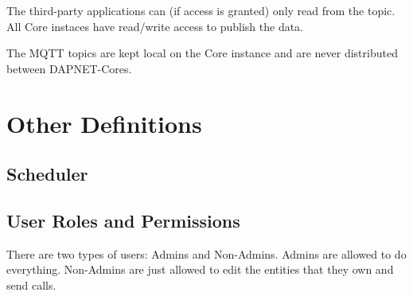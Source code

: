 The third-party applications can (if access is granted) only read from the
topic. All Core instaces have read/write access to publish the data.

The MQTT topics are kept local on the Core instance and are never distributed
between DAPNET-Cores.

\section{Other Definitions}

\subsection{Scheduler}
\label{dapnetdef:other:scheduler}

\subsection{User Roles and Permissions}
There are two types of users: Admins and Non-Admins. Admins are allowed to do
everything. Non-Admins are just allowed to edit the entities that they own and
send calls. 
